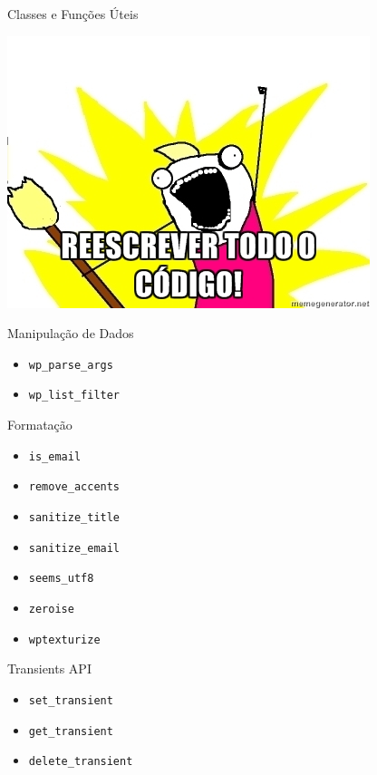 \documentclass{beamer}
\begin{document}
\begin{frame}{Classes e Funções Úteis}
\begin{center}
  \includegraphics[height=0.8\textheight]{./img/rewrite.jpg}
\end{center}
\end{frame}

\begin{frame}{Manipulação de Dados}
\begin{itemize}
  \pause \item \texttt{wp\_parse\_args}
  \pause \item \texttt{wp\_list\_filter}
\end{itemize}
\end{frame}

\begin{frame}{Formatação}
\begin{itemize}
  \pause \item \texttt{is\_email}
  \pause \item \texttt{remove\_accents}
  \pause \item \texttt{sanitize\_title}
  \pause \item \texttt{sanitize\_email}
  \pause \item \texttt{seems\_utf8}
  \pause \item \texttt{zeroise}
  \pause \item \texttt{wptexturize}
\end{itemize}
\end{frame}

\begin{frame}{Transients API}
\begin{itemize}
  \pause \item \texttt{set\_transient}
  \pause \item \texttt{get\_transient}
  \pause \item \texttt{delete\_transient}
\end{itemize}
\end{frame}
\end{document}
